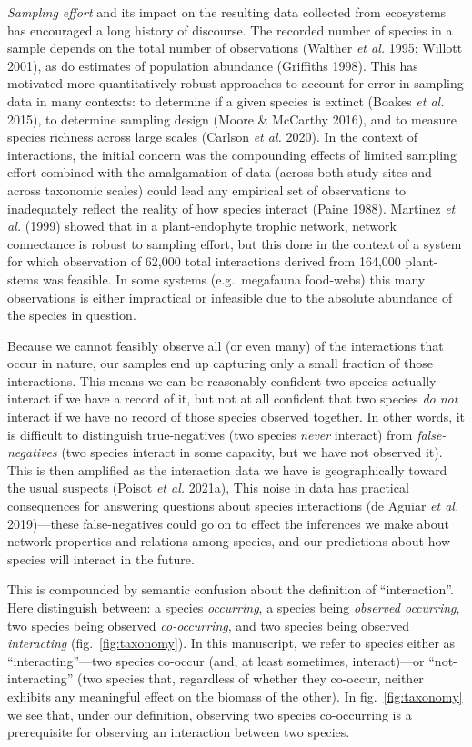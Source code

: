 \documentclass[11pt]{article}
\begin{document}
\emph{Sampling effort} and its impact on the resulting data collected
from ecosystems has encouraged a long history of discourse. The recorded
number of species in a sample depends on the total number of
observations (Walther \emph{et al.} 1995; Willott 2001), as do estimates
of population abundance (Griffiths 1998). This has motivated more
quantitatively robust approaches to account for error in sampling data
in many contexts: to determine if a given species is extinct (Boakes
\emph{et al.} 2015), to determine sampling design (Moore \& McCarthy
2016), and to measure species richness across large scales (Carlson
\emph{et al.} 2020). In the context of interactions, the initial concern
was the compounding effects of limited sampling effort combined with the
amalgamation of data (across both study sites and across taxonomic
scales) could lead any empirical set of observations to inadequately
reflect the reality of how species interact (Paine 1988). Martinez
\emph{et al.} (1999) showed that in a plant-endophyte trophic network,
network connectance is robust to sampling effort, but this done in the
context of a system for which observation of 62,000 total interactions
derived from 164,000 plant-stems was feasible. In some systems
(e.g.~megafauna food-webs) this many observations is either impractical
or infeasible due to the absolute abundance of the species in question.

Because we cannot feasibly observe all (or even many) of the
interactions that occur in nature, our samples end up capturing only a
small fraction of those interactions. This means we can be reasonably
confident two species actually interact if we have a record of it, but
not at all confident that two species \emph{do not} interact if we have
no record of those species observed together. In other words, it is
difficult to distinguish true-negatives (two species \emph{never}
interact) from \emph{false-negatives} (two species interact in some
capacity, but we have not observed it). This is then amplified as the
interaction data we have is geographically toward the usual suspects
(Poisot \emph{et al.} 2021a), This noise in data has practical
consequences for answering questions about species interactions (de
Aguiar \emph{et al.} 2019)---these false-negatives could go on to effect
the inferences we make about network properties and relations among
species, and our predictions about how species will interact in the
future.

This is compounded by semantic confusion about the definition of
``interaction''. Here distinguish between: a species \emph{occurring}, a
species being \emph{observed occurring}, two species being observed
\emph{co-occurring}, and two species being observed \emph{interacting}
(fig.~\ref{fig:taxonomy}). In this manuscript, we refer to species
either as ``interacting''---two species co-occur (and, at least
sometimes, interact)---or ``not-interacting'' (two species that,
regardless of whether they co-occur, neither exhibits any meaningful
effect on the biomass of the other). In fig.~\ref{fig:taxonomy} we see
that, under our definition, observing two species co-occurring is a
prerequisite for observing an interaction between two species.
\end{document}
